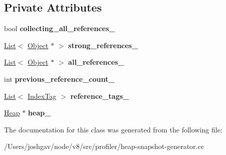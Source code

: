 \subsection*{Private Attributes}
\begin{DoxyCompactItemize}
\item 
bool {\bfseries collecting\+\_\+all\+\_\+references\+\_\+}\hypertarget{classv8_1_1internal_1_1_roots_references_extractor_a8a469f4dd6faa17eb183aa6f3db9105a}{}\label{classv8_1_1internal_1_1_roots_references_extractor_a8a469f4dd6faa17eb183aa6f3db9105a}

\item 
\hyperlink{classv8_1_1internal_1_1_list}{List}$<$ \hyperlink{classv8_1_1internal_1_1_object}{Object} $\ast$ $>$ {\bfseries strong\+\_\+references\+\_\+}\hypertarget{classv8_1_1internal_1_1_roots_references_extractor_a665fc601c7e49d3c422667a6d2c54d4b}{}\label{classv8_1_1internal_1_1_roots_references_extractor_a665fc601c7e49d3c422667a6d2c54d4b}

\item 
\hyperlink{classv8_1_1internal_1_1_list}{List}$<$ \hyperlink{classv8_1_1internal_1_1_object}{Object} $\ast$ $>$ {\bfseries all\+\_\+references\+\_\+}\hypertarget{classv8_1_1internal_1_1_roots_references_extractor_a1648fc0aeda45c93c1dacf2da30fa7c4}{}\label{classv8_1_1internal_1_1_roots_references_extractor_a1648fc0aeda45c93c1dacf2da30fa7c4}

\item 
int {\bfseries previous\+\_\+reference\+\_\+count\+\_\+}\hypertarget{classv8_1_1internal_1_1_roots_references_extractor_ad55d37e87230023a8496c93bf9e522d2}{}\label{classv8_1_1internal_1_1_roots_references_extractor_ad55d37e87230023a8496c93bf9e522d2}

\item 
\hyperlink{classv8_1_1internal_1_1_list}{List}$<$ \hyperlink{structv8_1_1internal_1_1_roots_references_extractor_1_1_index_tag}{Index\+Tag} $>$ {\bfseries reference\+\_\+tags\+\_\+}\hypertarget{classv8_1_1internal_1_1_roots_references_extractor_a72b077dd04d0f341dc7b47d82a7bd1cd}{}\label{classv8_1_1internal_1_1_roots_references_extractor_a72b077dd04d0f341dc7b47d82a7bd1cd}

\item 
\hyperlink{classv8_1_1internal_1_1_heap}{Heap} $\ast$ {\bfseries heap\+\_\+}\hypertarget{classv8_1_1internal_1_1_roots_references_extractor_a1da9887407b871a2f36b19df9da52b8f}{}\label{classv8_1_1internal_1_1_roots_references_extractor_a1da9887407b871a2f36b19df9da52b8f}

\end{DoxyCompactItemize}


The documentation for this class was generated from the following file\+:\begin{DoxyCompactItemize}
\item 
/\+Users/joshgav/node/v8/src/profiler/heap-\/snapshot-\/generator.\+cc\end{DoxyCompactItemize}
